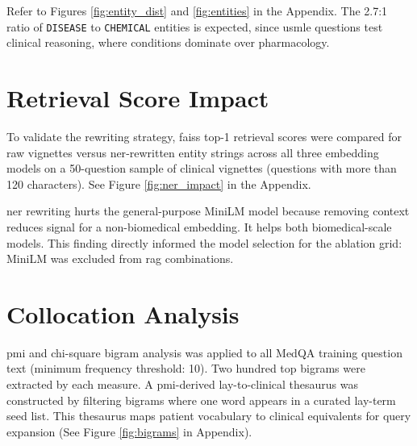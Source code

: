 Refer to Figures \ref{fig:entity_dist} and \ref{fig:entities} in the Appendix. The 2.7:1 ratio of \texttt{DISEASE} to \texttt{CHEMICAL} entities is expected, since \gls{usmle} questions test clinical reasoning, where conditions dominate over pharmacology.

\section{Retrieval Score Impact}
To validate the rewriting strategy, \gls{faiss} top-1 retrieval scores were compared for raw vignettes versus \gls{ner}-rewritten entity strings across all three embedding models on a 50-question sample of clinical vignettes (questions with more than 120 characters). See Figure \ref{fig:ner_impact} in the Appendix.

\gls{ner} rewriting hurts the general-purpose MiniLM model because removing context reduces signal for a non-biomedical embedding. It helps both biomedical-scale models. This finding directly informed the model selection for the ablation grid: MiniLM was excluded from \gls{rag} combinations.

\section{Collocation Analysis}

\gls{pmi} and chi-square bigram analysis was applied to all MedQA training question text (minimum frequency threshold: 10). Two hundred top bigrams were extracted by each measure. A \gls{pmi}-derived lay-to-clinical thesaurus was constructed by filtering bigrams where one word appears in a curated lay-term seed list. This thesaurus maps patient vocabulary to clinical equivalents for query expansion (See Figure \ref{fig:bigrams} in Appendix).
